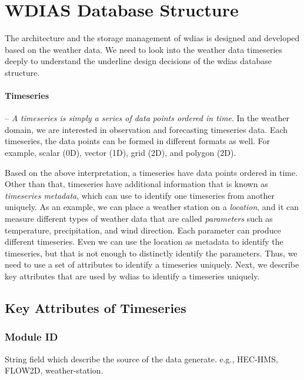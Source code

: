 \section{WDIAS Database Structure}
\label{se:db_struct}

The architecture and the storage management of \acrshort{wdias} is designed and developed based on the weather data. We need to look into the weather data timeseries deeply to understand the underline design decisions of the \acrshort{wdias} database structure.

\paragraph{Timeseries}-- \emph{A timeseries is simply a series of data points ordered in time}. In the weather domain, we are interested in observation and forecasting timeseries data. Each timeseries, the data points can be formed in different formats as well. For example, scalar (0D), vector (1D), grid (2D), and polygon (2D).

Based on the above interpretation, a timeseries have data points ordered in time. Other than that, timeseries have additional information that is known as \emph{timeseries metadata}, which can use to identify one timeseries from another uniquely. As an example, we can place a weather station on a \emph{location}, and it can measure different types of weather data that are called \emph{parameters} such as temperature, precipitation, and wind direction. Each parameter can produce different timeseries. Even we can use the location as metadata to identify the timeseries, but that is not enough to distinctly identify the parameters. Thus, we need to use a set of attributes to identify a timeseries uniquely. Next, we describe key attributes that are used by \acrshort{wdias} to identify a timeseries uniquely.


\subsection{Key Attributes of Timeseries}
\label{subse:timeseries_key_attributes}

\subsubsection{Module ID}
String field which describe the source of the data generate. e.g., HEC-HMS, FLOW2D, weather-station.

